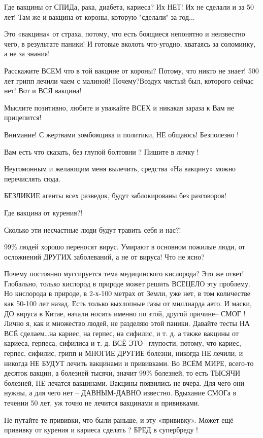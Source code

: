 \begin{itemize}
Где вакцины от СПИДа, рака, диабета, кариеса? Их НЕТ! Их не сделали и за 50
лет! Там же и вакцина от короны, которую "сделали" за год...

Это «вакцина» от страха, потому, что есть боящиеся непонятно и неизвестно чего,
в результате паники! И готовые вколоть что-угодно, хватаясь за соломинку, а не
за знания!

Расскажите ВСЕМ что в той вакцине от короны? Потому, что никто не знает! 500
лет грипп лечили чаем с малиной! Почему?Воздух чистый был, которого сейчас нет!
Вот и ВСЯ вакцина!

Мыслите позитивно, любите и уважайте ВСЕХ и никакая зараза к Вам не прицепится!

Внимание! С жертвами зомбоящика и политики, НЕ общаюсь! Безполезно !

Вам есть что сказать, без глупой болтовни ? Пишите в личку !

Неугомонным и желающим меня вылечить, средства «На вакцину» можно перечислять
сюда.

БЕЗЛИКИЕ агенты всех разведок, будут заблокированы без разговоров!

Где вакцина от курения?!

Сколько эти несчастные люди будут травить себя и нас?!

99\% людей хорошо переносят вирус. Умирают в основном пожилые люди, от
осложнений ДРУГИХ заболеваний, а не от вируса! Что не ясно?

Почему постоянно муссируется тема медицинского кислорода? Это же ответ!
Глобально, только кислород в природе может решить ВСЕЦЕЛО эту проблему. Но
кислорода в природе, в 2-х-100 метрах от Земли, уже нет, в том количестве как
50-100 лет назад. Есть только выхлопные газы от миллиарда авто. И маски, ДО
вируса в Китае, начали носить именно по этой, другой причине– СМОГ ! Лично я,
как и множество людей, не разделяю этой паники. Давайте тесты НА ВСЁ сделаем…на
кариес, на герпес, на сифилис, и т. д. а также вакцины от кариеса, герпеса,
сифилиса и т. д. ВСЁ ЭТО– глупости, потому, что кариес, герпес, сифилис, грипп и
МНОГИЕ ДРУГИЕ болезни, никогда НЕ лечили, и никогда НЕ БУДУТ лечить вакцинами и
прививками. Во ВСЁМ МИРЕ, всего-то десяток вакцин, а болезней тысячи, значит 99\%
болезней, то есть ТЫСЯЧИ болезней, НЕ лечатся вакцинами. Вакцины появились не
вчера. Для чего они нужны, а для чего нет – ДАВНЫМ-ДАВНО известно. Вдыхание СМОГа
в течении 50 лет, уж точно не лечится вакцинами и прививками.

Не путайте те прививки, что были раньше, и эту «прививку». Может ещё прививку
от курения и кариеса сделать ? БРЕД в супербреду !


\end{itemize}
